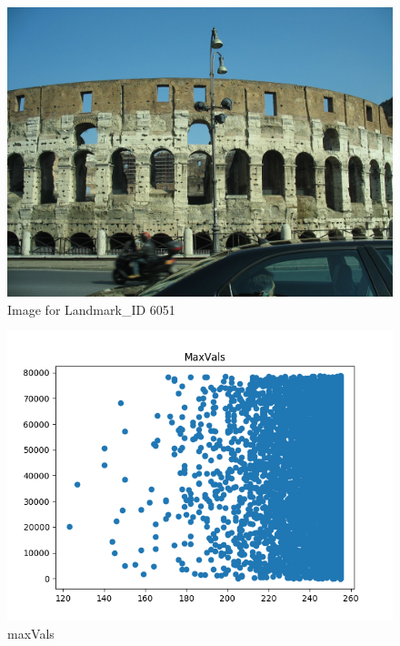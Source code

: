 \begin{figure}
	\includegraphics[width=\textwidth]{images/6051}
	\caption{Image for Landmark\_ID 6051}
	\label{6051}
\end{figure}

\begin{figure}
	\includegraphics[width=\textwidth]{images/maxVals}
	\caption{maxVals}
	\label{maxVals}
\end{figure}

